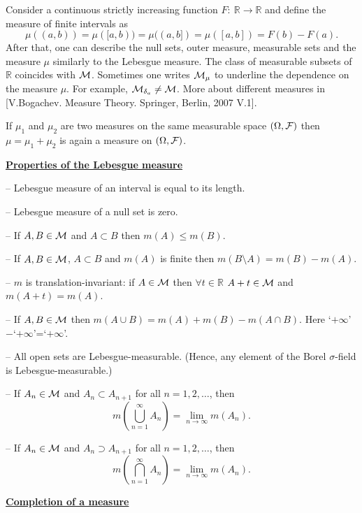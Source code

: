 \documentclass[a4paper,10pt]{article}
\def\RR{\mathbb{R}}
\newcommand{\1}[1]{\mathbf{1}_{\{#1\}}}
\begin{document}
Consider a continuous strictly increasing function $F:~\RR\to\RR$ and define the measure of finite intervals as
  $$\mu((a,b))=\mu([a,b))=\mu((a,b])=\mu([a,b])=F(b)-F(a).$$
After that, one can describe the null sets, outer measure, measurable sets and the measure $\mu$ similarly to the Lebesgue measure. The class of measurable subsets of $\RR$ coincides with $\cal M$. Sometimes one writes ${\cal M}_\mu$ to underline the dependence on the measure $\mu$. For example, ${\cal M}_{\delta_a}\ne{\cal M}$. More about different measures in [V.Bogachev. Measure Theory. Springer, Berlin, 2007 V.1].

If $\mu_1$ and $\mu_2$ are two measures on the same measurable space $(\Omega,{\cal F})$ then $\mu=\mu_1+\mu_2$ is again a measure on $(\Omega,{\cal F})$.
\vspace{3mm}

\begin{center}\bf\underline{Properties of the Lebesgue measure} \end{center}\vspace{3mm}

-- Lebesgue measure of an interval is equal to its length.

-- Lebesgue measure of a null set is zero.

-- If $A,B\in{\cal M}$ and $A\subset B$ then $m(A)\le m(B)$.

--  If $A,B\in{\cal M}$, $A\subset B$ and $m(A)$ is finite then $m(B\setminus A)=m(B)-m(A)$.

-- $m$ is translation-invariant: if $A\in{\cal M}$ then $\forall t\in\RR$ $A+t\in{\cal M}$ and $m(A+t)=m(A)$.

-- If $A,B\in{\cal M}$ then $m(A\cup B)=m(A)+m(B)-m(A\cap B)$. Here `$+\infty$'$-$`$+\infty$'=`$+\infty$'.

-- All open sets are Lebesgue-measurable. (Hence, any element of the Borel $\sigma$-field is Lebesgue-measurable.)

-- If $A_n\in{\cal M}$ and $A_n\subset A_{n+1}$ for all $n=1,2,\ldots$, then
  $$m\left(\bigcup_{n=1}^\infty A_n\right)=\lim_{n\to\infty} m(A_n).$$

-- If $A_n\in{\cal M}$ and $A_n\supset A_{n+1}$ for all $n=1,2,\ldots$, then
$$m\left(\bigcap_{n=1}^\infty A_n\right)=\lim_{n\to\infty} m(A_n).$$\vspace{3mm}

\begin{center}\bf\underline{Completion of a measure} \end{center}
\end{document}
